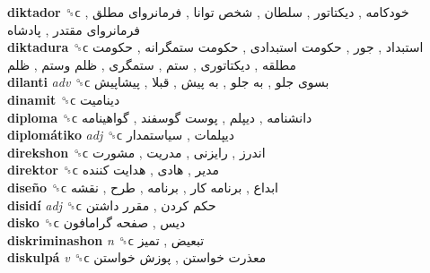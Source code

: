 \textbf{diktador} ␝ϲ   خودکامه ,  دیکتاتور ,  سلطان ,  شخص توانا ,  فرمانروای مطلق ,  فرمانروای مقتدر ,  پادشاه   \\
\textbf{diktadura} ␝ϲ   استبداد ,  جور ,  حکومت استبدادی ,  حکومت ستمگرانه ,  حکومت مطلقه ,  دیکتاتوری ,  ستم ,  ستمگری ,  ظلم وستم ,  ظلم   \\
\textbf{dilanti} \emph{adv}  ␝ϲ   بسوی جلو ,  به جلو ,  به پیش ,  قبلا ,  پیشاپیش   \\
\textbf{dinamit} ␝ϲ   دینامیت   \\
\textbf{diploma} ␝ϲ   دانشنامه ,  دیپلم ,  پوست گوسفند ,  گواهینامه   \\
\textbf{diplomátiko} \emph{adj}  ␝ϲ   دیپلمات ,  سیاستمدار   \\
\textbf{direkshon} ␝ϲ   اندرز ,  رایزنی ,  مدریت ,  مشورت   \\
\textbf{direktor} ␝ϲ   مدیر ,  هادی ,  هدایت کننده   \\
\textbf{diseño} ␝ϲ   ابداع ,  برنامه کار ,  برنامه ,  طرح ,  نقشه   \\
\textbf{disidí} \emph{adj}  ␝ϲ   حکم کردن ,  مقرر داشتن   \\
\textbf{disko} ␝ϲ   دیس ,  صفحه گرامافون   \\
\textbf{diskriminashon} \emph{n}  ␝ϲ   تبعیض ,  تمیز   \\
\textbf{diskulpá} \emph{v}  ␝ϲ   معذرت خواستن ,  پوزش خواستن   \\
